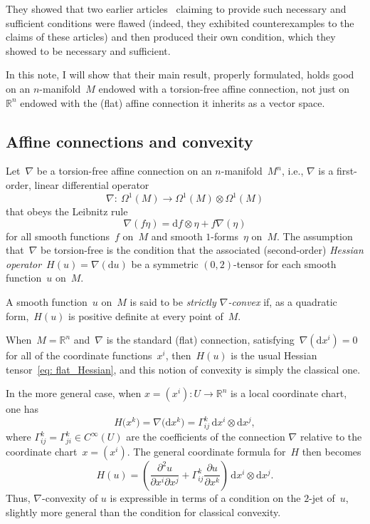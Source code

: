 \documentclass[pdftex]{sigma}
\renewcommand{\d}{\mathrm{d}}%
\newcommand{\bbR}{{\mathbb R}}
\numberwithin{equation}{section}
\begin{document}
They showed that two earlier articles~\cite{MR1655519,MR1652709}
claiming to provide such necessary and sufficient conditions were flawed
(indeed, they exhibited counterexamples to the claims of these articles)
and then produced their own condition,
which they showed to be necessary and sufficient.

In this note, I will show that their main result,
properly formulated, holds good on an $n$-manifold~$M$
endowed with a torsion-free affine connection,
not just on~$\bbR^n$ endowed with the (flat) affine connection
it inherits as a vector space.

\subsection{Affine connections and convexity}

Let~$\nabla$ be a torsion-free affine connection on an $n$-manifold~$M^n$,
i.e., $\nabla$ is a first-order, linear differential operator
\begin{equation*}
\nabla \colon \ \Omega^1(M)\to \Omega^1(M)\otimes \Omega^1(M)
\end{equation*}
that obeys the Leibnitz rule
\begin{equation*}
\nabla (f\eta) = \d f\otimes\eta + f \nabla(\eta)
\end{equation*}
for all smooth functions~$f$ on~$M$ and smooth $1$-forms~$\eta$ on~$M$.
The assumption that~$\nabla$ be torsion-free
is the condition that the associated (second-order)
\emph{Hessian operator}~$H(u)=\nabla(\d u)$
be a symmetric $(0,2)$-tensor for each smooth function~$u$ on~$M$.

A smooth function~$u$ on~$M$ is said to be {\it strictly $\nabla$-convex}
if, as a quadratic form,~$H(u)$ is positive definite at every point of~$M$.

When~$M=\bbR^n$ and~$\nabla$ is the standard (flat) connection,
satisfying~$\nabla(\d x^i) = 0$ for all of the coordinate functions~$x^i$,
then~$H(u)$ is the usual Hessian tensor~\eqref{eq: flat_Hessian},
and this notion of convexity is simply the classical one.

In the more general case, when $x = (x^i)\colon U\to \bbR^n$ is a local
coordinate chart, one has
\begin{equation*}
H\big(x^k\big) = \nabla\big(\d x^k\big) = \Gamma^k_{ij}\,\d x^i\otimes\d x^j,
\end{equation*}
where $\Gamma^k_{ij}=\Gamma^k_{ji}\in C^\infty(U)$
are the coefficients of the connection $\nabla$ relative
to the coordinate chart~$x=(x^i)$.
The general coordinate formula for~$H$ then becomes
\begin{equation*}
H(u) = \left(\frac{\partial^2 u}{\partial x^i\partial x^j}
+ \Gamma^k_{ij} \frac{\partial u}{\partial x^k}\right)
\,\d x^i\otimes\d x^j.
\end{equation*}
Thus, $\nabla$-convexity of $u$ is expressible in terms of a condition
on the $2$-jet of~$u$, slightly more general than the condition for
classical convexity.
\end{document}
